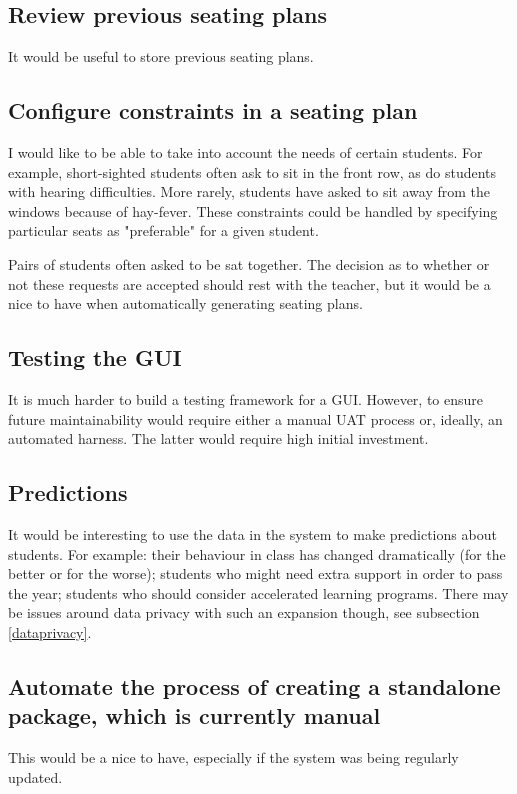 \documentclass[10pt]{article}
\begin{document}
\subsection{Review previous seating plans}
It would be useful to store previous seating plans.

\subsection{Configure constraints in a seating plan}
I would like to be able to take into account the needs of certain students. For example, short-sighted students often ask to sit in the front row, as do students with hearing difficulties. More rarely, students have asked to sit away from the windows because of hay-fever. These constraints could be handled by specifying particular seats as "preferable" for a given student.

Pairs of students often asked to be sat together. The decision as to whether or not these requests are accepted should rest with the teacher, but it would be a nice to have when automatically generating seating plans.

\subsection{Testing the GUI}
It is much harder to build a testing framework for a GUI. However, to ensure future maintainability would require either a manual UAT process or, ideally, an automated harness. The latter would require high initial investment.

\subsection{Predictions}
It would be interesting to use the data in the system to make predictions about students. For example: their behaviour in class has changed dramatically (for the better or for the worse); students who might need extra support in order to pass the year; students who should consider accelerated learning programs. There may be issues around data privacy with such an expansion though, see subsection \ref{dataprivacy}.

\subsection{Automate the process of creating a standalone package, which is currently manual}
This would be a nice to have, especially if the system was being regularly updated.
\end{document}

